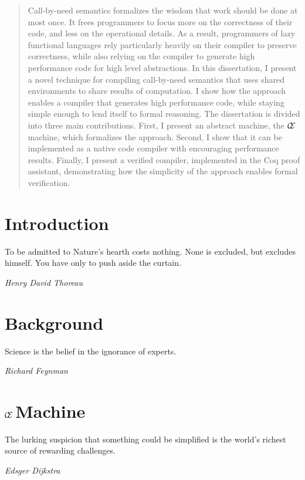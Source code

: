 \documentclass[botnum]{unmeethesis}
\def\ce{$\mathcal{\mathcal{C} \mskip -4mu \mathcal{E}} \mskip 4mu$}
\begin{document}
\begin{abstract}
Call-by-need semantics formalizes the wisdom that work should be done at most
once. It frees programmers to focus more on the correctness of their code, and
less on the operational details. As a result, programmers of lazy functional
languages rely particularly heavily on their compiler to preserve correctness,
while also relying on the compiler to generate high performance code for high
level abstractions. In this dissertation, I present a novel technique for
compiling call-by-need semantics that uses shared environments to share
results of computation. I show how the approach enables a compiler that
generates high performance code, while staying simple enough to lend itself to
formal reasoning. The dissertation is divided into three main contributions.
First, I present an abstract machine, the \ce machine, which formalizes the
approach.  Second, I show that it can be implemented as a native code compiler
with encouraging performance results.  Finally, I present a verified compiler,
implemented in the Coq proof assistant, demonstrating how the simplicity of
the approach enables formal verification.
\clearpage %
\end{abstract}

\tableofcontents
\listoffigures

\mainmatter

\chapter{Introduction}\label{chap:intro}
\epigraph{To be admitted to Nature's hearth costs nothing. None is excluded, but
excludes himself. You have only to push aside the curtain.}{\textit{Henry David
Thoreau}}


\chapter{Background}\label{chap:background}
\epigraph{Science is the belief in the ignorance of experts.}{\textit{Richard
Feynman}}


\chapter{\ce Machine}\label{chap:ce}
\epigraph{The lurking suspicion that something could be simplified is the
world's richest source of rewarding challenges.}{\textit{Edsger Dijkstra}}



\end{document}
